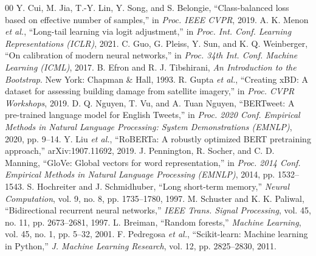 \documentclass[conference]{IEEEtran}
\begin{document}
\begin{thebibliography}{00}
 Y. Cui, M. Jia, T.-Y. Lin, Y. Song, and S. Belongie, ``Class-balanced loss based on effective number of samples,'' in \textit{Proc. IEEE CVPR}, 2019.
 A. K. Menon \textit{et al.}, ``Long-tail learning via logit adjustment,'' in \textit{Proc. Int. Conf. Learning Representations (ICLR)}, 2021.
 C. Guo, G. Pleiss, Y. Sun, and K. Q. Weinberger, ``On calibration of modern neural networks,'' in \textit{Proc. 34th Int. Conf. Machine Learning (ICML)}, 2017.
 B. Efron and R. J. Tibshirani, \textit{An Introduction to the Bootstrap}. New York: Chapman \& Hall, 1993.
 R. Gupta \textit{et al.}, ``Creating xBD: A dataset for assessing building damage from satellite imagery,'' in \textit{Proc. CVPR Workshops}, 2019.
 D. Q. Nguyen, T. Vu, and A. Tuan Nguyen, ``BERTweet: A pre-trained language model for English Tweets,'' in \textit{Proc. 2020 Conf. Empirical Methods in Natural Language Processing: System Demonstrations (EMNLP)}, 2020, pp. 9--14.
 Y. Liu \textit{et al.}, ``RoBERTa: A robustly optimized BERT pretraining approach,'' arXiv:1907.11692, 2019.
 J. Pennington, R. Socher, and C. D. Manning, ``GloVe: Global vectors for word representation,'' in \textit{Proc. 2014 Conf. Empirical Methods in Natural Language Processing (EMNLP)}, 2014, pp. 1532--1543.
 S. Hochreiter and J. Schmidhuber, ``Long short-term memory,'' \textit{Neural Computation}, vol. 9, no. 8, pp. 1735--1780, 1997.
 M. Schuster and K. K. Paliwal, ``Bidirectional recurrent neural networks,'' \textit{IEEE Trans. Signal Processing}, vol. 45, no. 11, pp. 2673--2681, 1997.
 L. Breiman, ``Random forests,'' \textit{Machine Learning}, vol. 45, no. 1, pp. 5--32, 2001.
 F. Pedregosa \textit{et al.}, ``Scikit-learn: Machine learning in Python,'' \textit{J. Machine Learning Research}, vol. 12, pp. 2825--2830, 2011. %
\end{thebibliography}
\end{document}
